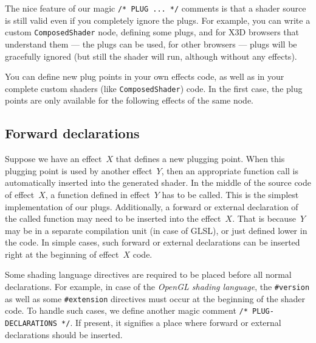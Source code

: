 \documentclass{egpubl}
\begin{document}
The nice feature of our magic \texttt{/* PLUG ... */} comments is that a shader source
is still valid even if you completely ignore the plugs. For example,
you can write a custom \texttt{ComposedShader} node, defining some plugs,
and for X3D browsers that understand them --- the plugs can be used,
for other browsers --- plugs will be gracefully ignored (but still
the shader will run, although without any effects).

You can define new plug points in your own effects code, as well as in your
complete custom shaders (like \texttt{ComposedShader}) code.
In the first case, the plug points
are only available for the following effects of the same node.

\subsection{Forward declarations}

Suppose we have an effect~$X$ that defines a new plugging point.
When this plugging point is used by another effect~$Y$,
then an appropriate function call is automatically inserted into the generated shader.
In the middle of the source code of effect~$X$,
a function defined in effect~$Y$ has to be called. This is the simplest
implementation of our plugs.
Additionally, a forward or external declaration of the called function
may need to be inserted into the effect~$X$. That is because~$Y$
may be in a separate compilation unit (in case of GLSL),
or just defined lower in the code. In simple cases, such forward or external
declarations can be inserted right at the beginning of effect~$X$ code.

Some shading language directives are required to be placed before
all normal declarations. For example, in case of the \emph{OpenGL shading language},
the \texttt{\#version} as well as some \texttt{\#extension} directives
must occur at the beginning of the shader code.
To handle such cases, we define another magic comment \texttt{/* PLUG-DECLARATIONS */}.
If present, it signifies a place where forward or external declarations
should be inserted.

\end{document}
